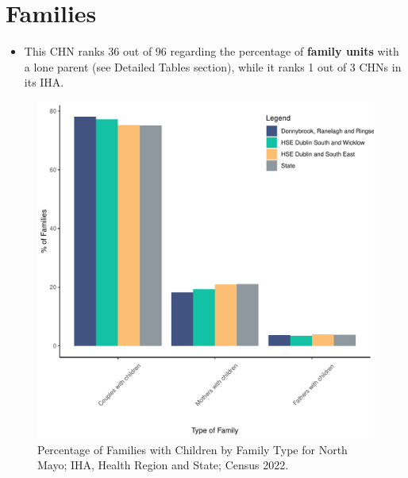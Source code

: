 \documentclass{article}
\begin{document}
\section{Families}\label{sect:Fam}
\begin{itemize}
\item This CHN ranks  36 out of 96 regarding the percentage of \textbf{family units} with a lone parent (see Detailed Tables section), while it ranks   1 out of 3 CHNs in its IHA.
\end{itemize}
\begin{figure}[H]
	\centering
	\includegraphics[width = 150mm]{../figures/FamED.pdf}
	\caption{Percentage of Families with Children by Family Type for North Mayo; IHA, Health Region and State; Census 2022.}
	\label{fig:vbnv}
	\end{figure}
	
\end{document}
